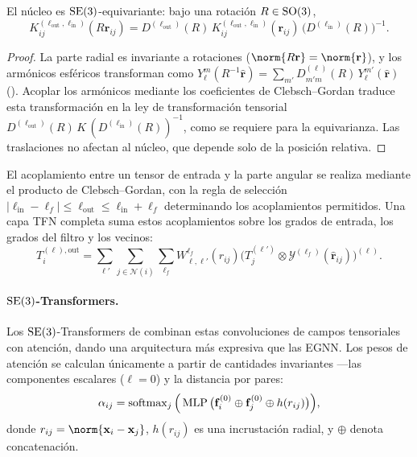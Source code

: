 \begin{proposition}
\label{prop:groups:tfn-kernel-equivariance}
El n\'ucleo  es $\operatorname{SE}(3)$-equivariante: bajo una
rotaci\'on $R \in \operatorname{SO}(3)$,
\begin{equation}
  K^{(\ell_{\text{out}}, \ell_{\text{in}})}_{ij}(R\mathbf{r}_{ij})
  = D^{(\ell_{\text{out}})}(R)\,
    K^{(\ell_{\text{out}}, \ell_{\text{in}})}_{ij}(\mathbf{r}_{ij})\,
    \big(D^{(\ell_{\text{in}})}(R)\big)^{-1}.
\end{equation}
\end{proposition}

\begin{proof}
La parte radial es invariante a rotaciones ($\norm{R\mathbf{r}} =
\norm{\mathbf{r}}$), y los arm\'onicos esf\'ericos transforman como
$Y_\ell^m(R^{-1}\hat{\mathbf{r}}) = \sum_{m'} D^{(\ell)}_{m'm}(R)\,
Y_\ell^{m'}(\hat{\mathbf{r}})$ (). Acoplar los
arm\'onicos mediante los coeficientes de Clebsch--Gordan traduce esta
transformaci\'on en la ley de transformaci\'on tensorial
$D^{(\ell_{\text{out}})}(R)\, K\, (D^{(\ell_{\text{in}})}(R))^{-1}$, como se
requiere para la equivarianza. Las traslaciones no afectan al n\'ucleo, que
depende solo de la posici\'on relativa.
\end{proof}

El acoplamiento entre un tensor de entrada y la parte angular se realiza mediante
el producto de Clebsch--Gordan, con la regla de selecci\'on $|\ell_{\text{in}} -
\ell_f| \leq \ell_{\text{out}} \leq \ell_{\text{in}} + \ell_f$ determinando los
acoplamientos permitidos. Una capa TFN completa suma estos acoplamientos sobre
los grados de entrada, los grados del filtro y los vecinos:
\begin{equation}
  T_i^{(\ell), \text{out}}
  = \sum_{\ell'} \sum_{j \in \mathcal{N}(i)} \sum_{\ell_f}
    W^{\ell_f}_{\ell, \ell'}(r_{ij})
    \big(T_j^{(\ell')} \otimes \mathcal{Y}^{(\ell_f)}(\hat{\mathbf{r}}_{ij})
    \big)^{(\ell)}.
\end{equation}

\paragraph{$\operatorname{SE}(3)$-Transformers.}
Los $\operatorname{SE}(3)$-Transformers de \citet{fuchs2020se3transformers} combinan estas
convoluciones de campos tensoriales con atenci\'on, dando una arquitectura m\'as
expresiva que las EGNN. Los pesos de atenci\'on se calculan \'unicamente a partir
de cantidades invariantes ---las componentes escalares ($\ell = 0$) y la
distancia por pares:
\begin{equation}
  \alpha_{ij} = \operatorname{softmax}_j\Big(\operatorname{MLP}\big(\mathbf{f}_i^{(0)} \oplus
    \mathbf{f}_j^{(0)} \oplus h(r_{ij})\big)\Big),
  \label{eq:groups:se3-attention}
\end{equation}
donde $r_{ij} = \norm{\mathbf{x}_i - \mathbf{x}_j}$, $h(r_{ij})$ es una
incrustaci\'on radial, y $\oplus$ denota concatenaci\'on.

